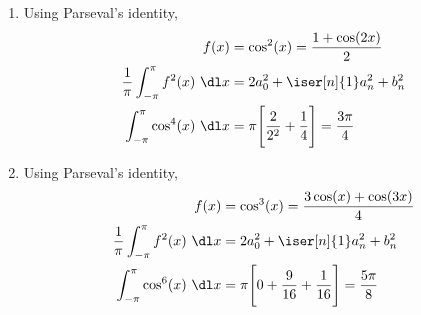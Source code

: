 \begin{enumerate}
\begin{figure}[H]
          \end{figure}

    \item Using Parseval's identity,
          \begin{align}
              f(x)             & =  \cos^2(x) = \frac{1 + \cos(2x)}{2}           \\
              \frac{1}{\pi} \int_{-\pi}^{\pi}f^2(x)
              \ \dl x          & = 2a_0^2 + \iser[n]{1} a_n^2 + b_n^2            \\
              \int_{-\pi}^{\pi}
              \cos^4(x)\ \dl x & = \pi \Bigg[ \frac{2}{2^2} + \frac{1}{4} \Bigg]
              = \frac{3\pi}{4}
          \end{align}

    \item Using Parseval's identity,
          \begin{align}
              f(x)             & =  \cos^3(x) = \frac{3\cos(x) + \cos(3x)}{4}        \\
              \frac{1}{\pi} \int_{-\pi}^{\pi}f^2(x)
              \ \dl x          & = 2a_0^2 + \iser[n]{1} a_n^2 + b_n^2                \\
              \int_{-\pi}^{\pi}
              \cos^6(x)\ \dl x & = \pi \Bigg[ 0 + \frac{9}{16} + \frac{1}{16} \Bigg]
              = \frac{5\pi}{8}
          \end{align}
\end{enumerate}